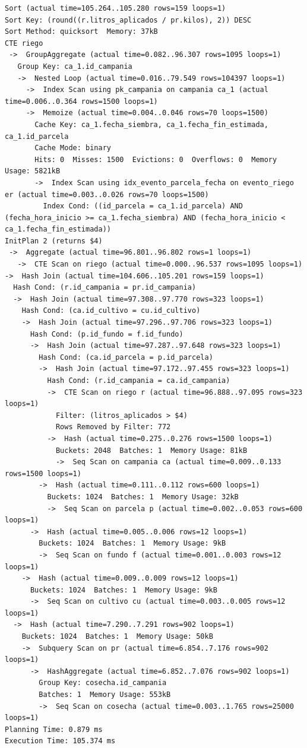 \documentclass[11pt,letterpaper]{article}
\begin{document}
\begin{lstlisting}[style=plano]
Sort (actual time=105.264..105.280 rows=159 loops=1)
Sort Key: (round((r.litros_aplicados / pr.kilos), 2)) DESC
Sort Method: quicksort  Memory: 37kB
CTE riego
 ->  GroupAggregate (actual time=0.082..96.307 rows=1095 loops=1)
   Group Key: ca_1.id_campania
   ->  Nested Loop (actual time=0.016..79.549 rows=104397 loops=1)
     ->  Index Scan using pk_campania on campania ca_1 (actual time=0.006..0.364 rows=1500 loops=1)
     ->  Memoize (actual time=0.004..0.046 rows=70 loops=1500)
       Cache Key: ca_1.fecha_siembra, ca_1.fecha_fin_estimada, ca_1.id_parcela
       Cache Mode: binary
       Hits: 0  Misses: 1500  Evictions: 0  Overflows: 0  Memory Usage: 5821kB
       ->  Index Scan using idx_evento_parcela_fecha on evento_riego er (actual time=0.003..0.026 rows=70 loops=1500)
         Index Cond: ((id_parcela = ca_1.id_parcela) AND (fecha_hora_inicio >= ca_1.fecha_siembra) AND (fecha_hora_inicio < ca_1.fecha_fin_estimada))
InitPlan 2 (returns $4)
 ->  Aggregate (actual time=96.801..96.802 rows=1 loops=1)
   ->  CTE Scan on riego (actual time=0.000..96.537 rows=1095 loops=1)
->  Hash Join (actual time=104.606..105.201 rows=159 loops=1)
  Hash Cond: (r.id_campania = pr.id_campania)
  ->  Hash Join (actual time=97.308..97.770 rows=323 loops=1)
    Hash Cond: (ca.id_cultivo = cu.id_cultivo)
    ->  Hash Join (actual time=97.296..97.706 rows=323 loops=1)
      Hash Cond: (p.id_fundo = f.id_fundo)
      ->  Hash Join (actual time=97.287..97.648 rows=323 loops=1)
        Hash Cond: (ca.id_parcela = p.id_parcela)
        ->  Hash Join (actual time=97.172..97.455 rows=323 loops=1)
          Hash Cond: (r.id_campania = ca.id_campania)
          ->  CTE Scan on riego r (actual time=96.888..97.095 rows=323 loops=1)
            Filter: (litros_aplicados > $4)
            Rows Removed by Filter: 772
          ->  Hash (actual time=0.275..0.276 rows=1500 loops=1)
            Buckets: 2048  Batches: 1  Memory Usage: 81kB
            ->  Seq Scan on campania ca (actual time=0.009..0.133 rows=1500 loops=1)
        ->  Hash (actual time=0.111..0.112 rows=600 loops=1)
          Buckets: 1024  Batches: 1  Memory Usage: 32kB
          ->  Seq Scan on parcela p (actual time=0.002..0.053 rows=600 loops=1)
      ->  Hash (actual time=0.005..0.006 rows=12 loops=1)
        Buckets: 1024  Batches: 1  Memory Usage: 9kB
        ->  Seq Scan on fundo f (actual time=0.001..0.003 rows=12 loops=1)
    ->  Hash (actual time=0.009..0.009 rows=12 loops=1)
      Buckets: 1024  Batches: 1  Memory Usage: 9kB
      ->  Seq Scan on cultivo cu (actual time=0.003..0.005 rows=12 loops=1)
  ->  Hash (actual time=7.290..7.291 rows=902 loops=1)
    Buckets: 1024  Batches: 1  Memory Usage: 50kB
    ->  Subquery Scan on pr (actual time=6.854..7.176 rows=902 loops=1)
      ->  HashAggregate (actual time=6.852..7.076 rows=902 loops=1)
        Group Key: cosecha.id_campania
        Batches: 1  Memory Usage: 553kB
        ->  Seq Scan on cosecha (actual time=0.003..1.765 rows=25000 loops=1)
Planning Time: 0.879 ms
Execution Time: 105.374 ms
\end{lstlisting}
\end{document}
